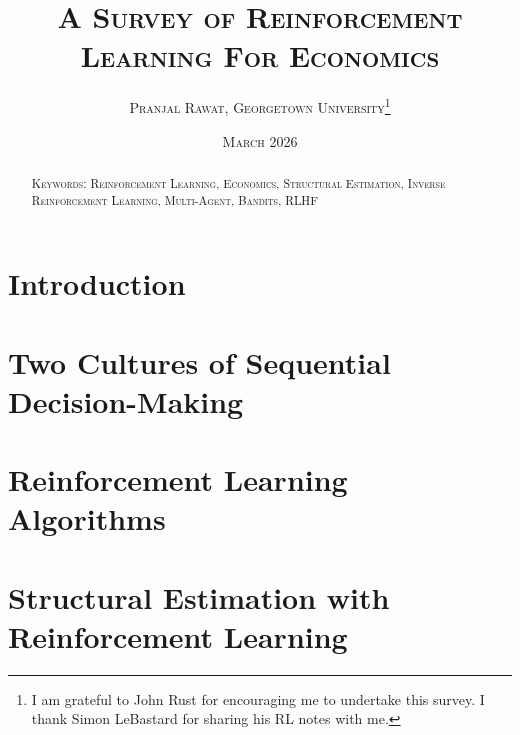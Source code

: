 \documentclass[11pt,notitlepage,a4paper]{article}
\begin{document}
\begin{titlepage}
\title{\textsc{A Survey of Reinforcement Learning For Economics}}
\author{
\textsc{Pranjal Rawat, Georgetown University}\thanks{I am grateful to John Rust for encouraging me to undertake this survey. I thank Simon LeBastard for sharing his RL notes with me.}\\
}
\date{\textsc{March 2026}}

\maketitle
\thispagestyle{empty}


\begin{abstract}
\noindent

\bigskip

\noindent \textsc{Keywords: Reinforcement Learning, Economics, Structural Estimation, Inverse Reinforcement Learning, Multi-Agent, Bandits, RLHF}

\end{abstract}

\end{titlepage}

\newpage
\tableofcontents
\newpage

\section{Introduction}
\label{section:intro}


\section{Two Cultures of Sequential Decision-Making}
\label{section:language}



\section{Reinforcement Learning Algorithms}
\label{section:rl_algorithms}





\section{Structural Estimation with Reinforcement Learning}
\label{section:rl_econ_models}

\end{document}
